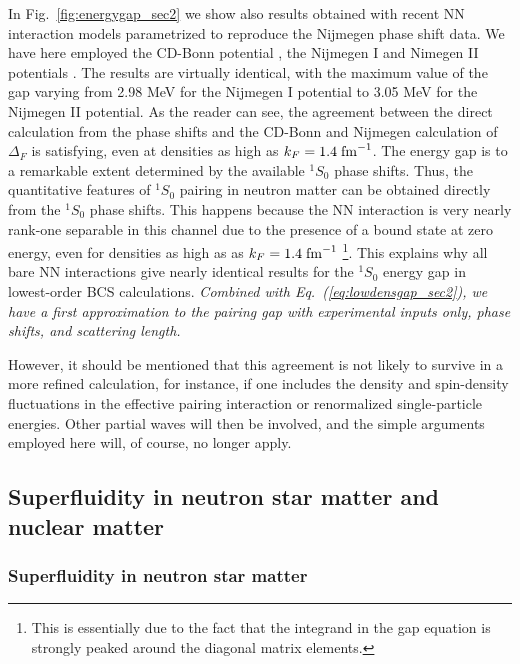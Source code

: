 \documentclass[rmp,preprint,aps,floatfix]{revtex4}
\begin{document}
In Fig.~\ref{fig:energygap_sec2} we show also results obtained
with recent NN interaction models parametrized to reproduce the
Nijmegen phase shift data. We have here employed  
the CD-Bonn potential \cite{cdbonn96},  
the Nijmegen I and Nimegen II potentials \cite{nijmegen94}. 
The results are virtually identical, with the maximum value 
of the gap varying from 2.98 MeV for the Nijmegen I potential to 3.05 MeV 
for the Nijmegen II potential.  
As the reader can see, the agreement 
between the direct calculation from the phase shifts and the CD-Bonn and
Nijmegen 
calculation of $\Delta_F$ is satisfying, even 
at densities as high as $k_F=1.4\;{\rm fm}^{-1}$.  
The energy gap 
is to a remarkable extent determined by the available $^1S_0$ phase shifts. 
Thus, the quantitative features 
of $^1S_0$ pairing in neutron matter can be obtained directly from 
the $^1S_0$ phase shifts. This happens because the NN interaction 
is very nearly rank-one separable in this channel due to the presence 
of a bound state at zero energy, even for densities as high as 
as $k_F=1.4\;{\rm fm}^{-1}$ \footnote{This is essentially due to the 
fact that the integrand in the gap equation is strongly peaked around  
the diagonal matrix elements.}. This explains why all bare NN interactions 
give nearly identical results for the $^1S_0$ energy gap in lowest-order 
BCS calculations.  {\em Combined with Eq.~(\ref{eq:lowdensgap_sec2}), we have a
first approximation to the pairing gap 
with experimental inputs only, phase shifts, and scattering length.}

However, 
it should be mentioned that this agreement 
is not likely to survive in a more refined calculation, for instance, 
if one includes the density and spin-density fluctuations in the 
effective pairing interaction or renormalized single-particle energies.
Other partial waves will then be involved, and the simple arguments 
employed here will, of course, no longer apply. 






\subsection{Superfluidity in neutron star matter and nuclear matter}
\label{subsec:NN_to_pairing_sec3}

\subsubsection{Superfluidity in neutron star matter}
\end{document}
